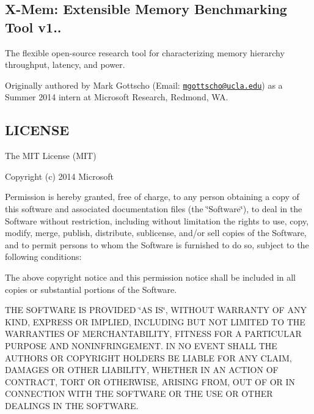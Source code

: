 \subsection*{X-\/\+Mem\+: Extensible Memory Benchmarking Tool v1.. }

The flexible open-\/source research tool for characterizing memory hierarchy throughput, latency, and power.

Originally authored by Mark Gottscho (Email\+: \href{mailto:mgottscho@ucla.edu}{\tt mgottscho@ucla.\+edu}) as a Summer 2014 intern at Microsoft Research, Redmond, W\+A. 

 \subsection*{L\+I\+C\+E\+N\+S\+E }

The M\+I\+T License (M\+I\+T)

Copyright (c) 2014 Microsoft

Permission is hereby granted, free of charge, to any person obtaining a copy of this software and associated documentation files (the \char`\"{}\+Software\char`\"{}), to deal in the Software without restriction, including without limitation the rights to use, copy, modify, merge, publish, distribute, sublicense, and/or sell copies of the Software, and to permit persons to whom the Software is furnished to do so, subject to the following conditions\+:

The above copyright notice and this permission notice shall be included in all copies or substantial portions of the Software.

T\+H\+E S\+O\+F\+T\+W\+A\+R\+E I\+S P\+R\+O\+V\+I\+D\+E\+D \char`\"{}\+A\+S I\+S\char`\"{}, W\+I\+T\+H\+O\+U\+T W\+A\+R\+R\+A\+N\+T\+Y O\+F A\+N\+Y K\+I\+N\+D, E\+X\+P\+R\+E\+S\+S O\+R I\+M\+P\+L\+I\+E\+D, I\+N\+C\+L\+U\+D\+I\+N\+G B\+U\+T N\+O\+T L\+I\+M\+I\+T\+E\+D T\+O T\+H\+E W\+A\+R\+R\+A\+N\+T\+I\+E\+S O\+F M\+E\+R\+C\+H\+A\+N\+T\+A\+B\+I\+L\+I\+T\+Y, F\+I\+T\+N\+E\+S\+S F\+O\+R A P\+A\+R\+T\+I\+C\+U\+L\+A\+R P\+U\+R\+P\+O\+S\+E A\+N\+D N\+O\+N\+I\+N\+F\+R\+I\+N\+G\+E\+M\+E\+N\+T. I\+N N\+O E\+V\+E\+N\+T S\+H\+A\+L\+L T\+H\+E A\+U\+T\+H\+O\+R\+S O\+R C\+O\+P\+Y\+R\+I\+G\+H\+T H\+O\+L\+D\+E\+R\+S B\+E L\+I\+A\+B\+L\+E F\+O\+R A\+N\+Y C\+L\+A\+I\+M, D\+A\+M\+A\+G\+E\+S O\+R O\+T\+H\+E\+R L\+I\+A\+B\+I\+L\+I\+T\+Y, W\+H\+E\+T\+H\+E\+R I\+N A\+N A\+C\+T\+I\+O\+N O\+F C\+O\+N\+T\+R\+A\+C\+T, T\+O\+R\+T O\+R O\+T\+H\+E\+R\+W\+I\+S\+E, A\+R\+I\+S\+I\+N\+G F\+R\+O\+M, O\+U\+T O\+F O\+R I\+N C\+O\+N\+N\+E\+C\+T\+I\+O\+N W\+I\+T\+H T\+H\+E S\+O\+F\+T\+W\+A\+R\+E O\+R T\+H\+E U\+S\+E O\+R O\+T\+H\+E\+R D\+E\+A\+L\+I\+N\+G\+S I\+N T\+H\+E S\+O\+F\+T\+W\+A\+R\+E. 


